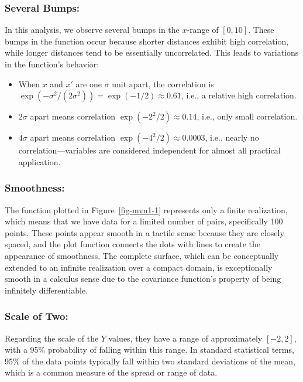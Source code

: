 \documentclass[
  letterpaper,
  DIV=11,
  numbers=noendperiod]{scrreprt}
\providecommand{\tightlist}{%
  \setlength{\itemsep}{0pt}\setlength{\parskip}{0pt}}\usepackage{longtable,booktabs,array}
\begin{document}
\subsubsection{Several Bumps:}\label{several-bumps}

In this analysis, we observe several bumps in the \(x\)-range of
\([0,10]\). These bumps in the function occur because shorter distances
exhibit high correlation, while longer distances tend to be essentially
uncorrelated. This leads to variations in the function's behavior:

\begin{itemize}
\tightlist
\item
  When \(x\) and \(x'\) are one \(\sigma\) unit apart, the correlation
  is
  \(\exp\left(-\sigma^2 / (2\sigma^2)\right) = \exp(-1/2) \approx 0.61\),
  i.e., a relative high correlation.
\item
  \(2\sigma\) apart means correlation \(\exp(− 2^2 /2) \approx 0.14\),
  i.e., only small correlation.
\item
  \(4\sigma\) apart means correlation \(\exp(− 4^2 /2) \approx 0.0003\),
  i.e., nearly no correlation---variables are considered independent for
  almost all practical application.
\end{itemize}

\subsubsection{Smoothness:}\label{smoothness}

The function plotted in Figure~\ref{fig-mvn1-1} represents only a finite
realization, which means that we have data for a limited number of
pairs, specifically 100 points. These points appear smooth in a tactile
sense because they are closely spaced, and the plot function connects
the dots with lines to create the appearance of smoothness. The complete
surface, which can be conceptually extended to an infinite realization
over a compact domain, is exceptionally smooth in a calculus sense due
to the covariance function's property of being infinitely
differentiable.

\subsubsection{Scale of Two:}\label{scale-of-two}

Regarding the scale of the \(Y\) values, they have a range of
approximately \([-2,2]\), with a 95\% probability of falling within this
range. In standard statistical terms, 95\% of the data points typically
fall within two standard deviations of the mean, which is a common
measure of the spread or range of data.
\end{document}
